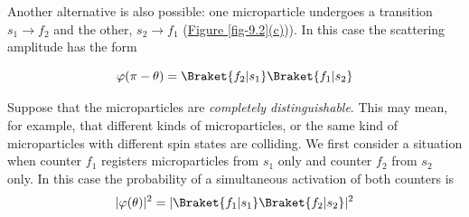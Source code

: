 \documentclass[a4paper,sfsidenotes,colorlinks=true]{tufte-book}
\numberwithin{equation}{section}
\numberwithin{figure}{section}
\begin{document}
Another alternative is also possible: one microparticle undergoes a transition $s_{1} \to f_{2}$ and the other, $s_{2} \to f_{1}$ (\hyperref[fig-9.2]{Figure \ref{fig-9.2}(c)})). In this case the scattering amplitude has the form

\begin{equation}%
\varphi (\pi - \theta) = \Braket{f_{2} | s_{1}} \Braket{f_{1} | s_{2}}
\label{eq-9.14}
\end{equation}

Suppose that the microparticles are \emph{completely distinguishable}. This may mean, for example, that different kinds of microparticles, or the same kind of microparticles with different spin states are colliding. We first consider a situation when counter $f_{1}$ registers microparticles from $s_{1}$ only and counter $f_{2}$ from $s_{2}$ only. In this case the probability of a simultaneous activation of both counters is
\begin{equation}%
|\varphi (\theta)|^{2} = | \Braket{f_{1} | s_{1}} \Braket{f_{2} | s_{2}}|^{2}
\label{eq-9.15}
\end{equation}
\end{document}
